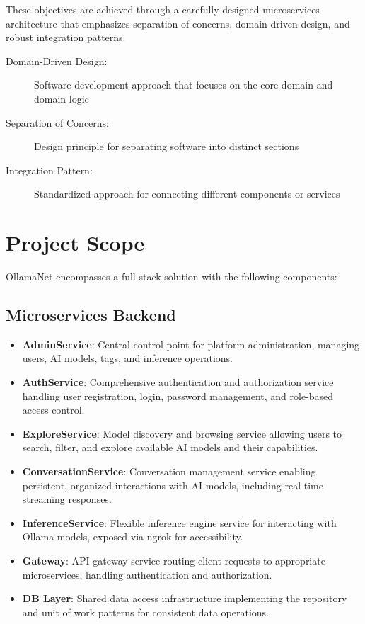 These objectives are achieved through a carefully designed microservices architecture that emphasizes separation of concerns, domain-driven design, and robust integration patterns.

\begin{terminology}
\begin{description}
    \item[Domain-Driven Design:] Software development approach that focuses on the core domain and domain logic
    \item[Separation of Concerns:] Design principle for separating software into distinct sections
    \item[Integration Pattern:] Standardized approach for connecting different components or services
\end{description}
\end{terminology}

\section{Project Scope}

OllamaNet encompasses a full-stack solution with the following components:

\subsection{Microservices Backend}
\begin{itemize}
    \item \textbf{AdminService}: Central control point for platform administration, managing users, AI models, tags, and inference operations.
    \item \textbf{AuthService}: Comprehensive authentication and authorization service handling user registration, login, password management, and role-based access control.
    \item \textbf{ExploreService}: Model discovery and browsing service allowing users to search, filter, and explore available AI models and their capabilities.
    \item \textbf{ConversationService}: Conversation management service enabling persistent, organized interactions with AI models, including real-time streaming responses.
    \item \textbf{InferenceService}: Flexible inference engine service for interacting with Ollama models, exposed via ngrok for accessibility.
    \item \textbf{Gateway}: API gateway service routing client requests to appropriate microservices, handling authentication and authorization.
    \item \textbf{DB Layer}: Shared data access infrastructure implementing the repository and unit of work patterns for consistent data operations.
\end{itemize}

